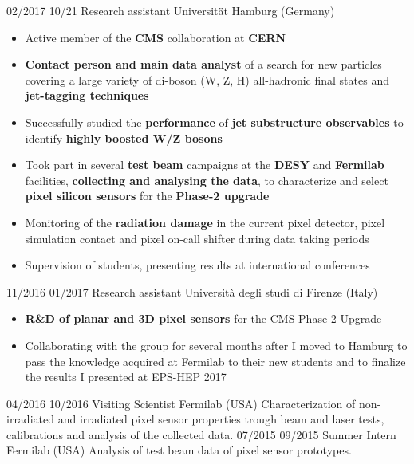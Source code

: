     \position
      {02/2017 \textemdash{} 10/21}
      {Research assistant}
      {Universit\"{a}t Hamburg (Germany)}
      {\begin{itemize}
\item Active member of the {\bf CMS} collaboration at {\bf CERN}
\item {\bf Contact person and main data analyst} of a search for new particles covering a large variety of di-boson (W, Z, H) all-hadronic final states and {\bf  jet-tagging techniques}
\item Successfully studied the {\bf performance} of {\bf jet substructure observables} to identify {\bf highly boosted W/Z bosons}
\item Took part in several {\bf test beam} campaigns at the {\bf DESY} and {\bf Fermilab} facilities, {\bf collecting and analysing the data}, to characterize and select {\bf pixel silicon sensors} for the {\bf Phase-2 upgrade}
\item Monitoring of the {\bf radiation damage} in the current pixel detector, pixel simulation contact and pixel on-call shifter during data taking periods
\item Supervision of students, presenting results at international conferences
\end{itemize}
}
    \position
      {11/2016 \textemdash{} 01/2017}
      {Research assistant}
      {Universit\`a degli studi di Firenze (Italy)}
      {\begin{itemize}
\item {\bf R\&D of planar and 3D pixel sensors} for the CMS Phase-2  Upgrade
\item Collaborating with the group for several months after I moved to Hamburg to pass the knowledge acquired at Fermilab to their new students and to finalize the results I presented at EPS-HEP 2017
\end{itemize} 
}

    \position
      {04/2016 \textemdash{} 10/2016}
      {Visiting Scientist}
      {Fermilab (USA)}
      {Characterization of non-irradiated and irradiated pixel sensor properties trough beam and laser tests, calibrations and analysis of the collected data.}
    \position
      {07/2015 \textemdash{} 09/2015}
      {Summer Intern}
      {Fermilab (USA)}
      {Analysis of test beam data of pixel sensor prototypes.}
\fi
